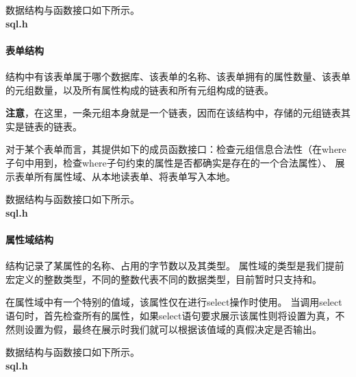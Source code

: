 \documentclass{article}
\begin{document}
\begin{spacing}{2}
                数据结构与函数接口如下所示。\\
                \textbf{sql.h}
                \begin{spacing}{1.15}
                
                \end{spacing}
            \paragraph{表单结构}
            结构中有该表单属于哪个数据库、该表单的名称、该表单拥有的属性数量、该表单的元组数量，以及所有属性构成的链表和所有元组构成的链表。
            
            \textbf{注意}，在这里，一条元组本身就是一个链表，因而在该结构中，存储的元组链表其实是链表的链表。

            对于某个表单而言，其提供如下的成员函数接口：检查元组信息合法性（在where子句中用到，检查where子句约束的属性是否都确实是存在的一个合法属性）、
            展示表单所有属性域、从本地读表单、将表单写入本地。

            数据结构与函数接口如下所示。\\
            \textbf{sql.h}
            \begin{spacing}{1.15}
            
            \end{spacing}

            \paragraph{属性域结构}
            结构记录了某属性的名称、占用的字节数以及其类型。
            属性域的类型是我们提前宏定义的整数类型，不同的整数代表不同的数据类型，目前暂时只支持和。
            
            在属性域中有一个特别的值域，该属性仅在进行select操作时使用。
            当调用select语句时，首先检查所有的属性，如果select语句要求展示该属性则将设置为真，不然则设置为假，最终在展示时我们就可以根据该值域的真假决定是否输出。

            数据结构与函数接口如下所示。\\
            \textbf{sql.h}
            \begin{spacing}{1.15}
            
            \end{spacing}
            

\end{spacing}
\end{document}
